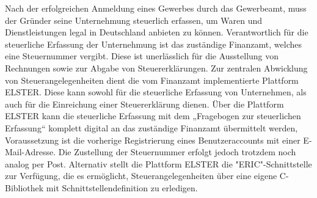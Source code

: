 Nach der erfolgreichen Anmeldung eines Gewerbes durch das Gewerbeamt, muss der Gründer seine Unternehmung steuerlich erfassen, um Waren und Dienstleistungen legal in Deutschland anbieten zu können.
 Verantwortlich für die steuerliche Erfassung der Unternehmung ist das zuständige Finanzamt, welches eine Steuernummer vergibt. Diese ist unerlässlich für die Ausstellung von Rechnungen sowie zur Abgabe von Steuererklärungen. 
 Zur zentralen Abwicklung von Steuerangelegenheiten dient die vom Finanzamt implementierte Plattform ELSTER.
 Diese kann sowohl für die steuerliche Erfassung von Unternehmen, als auch für die Einreichung einer Steuererklärung dienen. 
 Über die Plattform ELSTER kann die steuerliche Erfassung mit dem „Fragebogen zur steuerlichen Erfassung“ komplett digital an das zuständige Finanzamt übermittelt werden, Voraussetzung ist die vorherige Registrierung eines Benutzeraccounts mit einer E-Mail-Adresse. 
 Die Zustellung der Steuernummer erfolgt jedoch trotzdem noch analog per Post. 
 Alternativ stellt die Plattform ELSTER die "ERIC"-Schnittstelle zur Verfügung, die es ermöglicht, Steuerangelegenheiten über eine eigene C-Bibliothek mit Schnittstellendefinition zu erledigen. 
